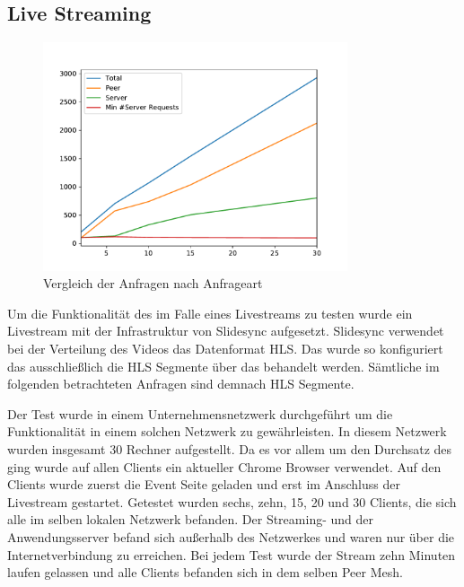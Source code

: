 \subsection{Live Streaming}
\begin{figure}[!h]
	\centering
	\includegraphics[width=0.8\textwidth]{figures/clients_line_chart}
	\caption[A Figure Short-Title]{Vergleich der Anfragen nach Anfrageart}
	\label{fig:live_stream_line_chart}
\end{figure}
Um die Funktionalität des \cdns im Falle eines Livestreams zu testen wurde ein Livestream mit der Infrastruktur von Slidesync aufgesetzt. Slidesync verwendet bei der Verteilung des Videos das Datenformat HLS. Das \cdn wurde so konfiguriert das ausschließlich die HLS Segmente über das \cdn behandelt werden. Sämtliche im folgenden betrachteten Anfragen sind demnach HLS Segmente. 

Der Test wurde in einem Unternehmensnetzwerk durchgeführt um die Funktionalität in einem solchen Netzwerk zu gewährleisten. In diesem Netzwerk wurden insgesamt 30 Rechner aufgestellt. Da es vor allem um den Durchsatz des \cdns ging wurde auf allen Clients ein aktueller Chrome Browser verwendet. Auf den Clients wurde zuerst die Event Seite geladen und erst im Anschluss der Livestream gestartet. Getestet wurden sechs, zehn, 15, 20 und 30 Clients, die sich alle im selben lokalen Netzwerk befanden. Der Streaming- und der Anwendungsserver befand sich außerhalb des Netzwerkes und waren nur über die Internetverbindung zu erreichen. Bei jedem Test wurde der Stream zehn Minuten laufen gelassen und alle Clients befanden sich in dem selben Peer Mesh.

